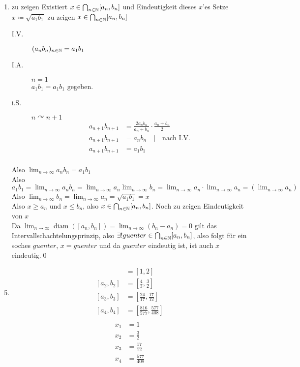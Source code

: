 \documentclass{gadsescript}
\DeclareMathOperator{\diam}{diam}
\begin{document}
\begin{proof*}
\begin{enumerate}[label=(\alph*)]
		\item zu zeigen Existiert $ x \in \bigcap_{n \in \mathbb{N}} [a_n, b_n] $ und Eindeutigkeit dieses $ x $'es
			Setze $ x \coloneqq \sqrt{a_1b_1}  $ zu zeigen $ x \in \bigcap_{n \in \mathbb{N}} [a_n, b_n] $
			\begin{description}
				\item[I.V.] $ (a_n b_n)_{n \in \mathbb{N} } = a_1b_1 $ 
				\item[I.A.] $ n = 1 $\\
					$ a_1 b_1 = a_1b_1 $ gegeben.
				\item[i.S.] $ n \curvearrowright n+1 $
					\begin{align*}
						a_{n+1}b_{n+1} &= \frac{ 2a_nb_n }{ a_n + b_n } \cdot \frac{ a_n + b_n }{ 2 } \\
						a_{n+1}b_{n+1} &= a_n b_n \quad | \quad \text{nach I.V.} \\
						a_{n+1}b_{n+1} &= a_1b_1 \\
					\end{align*}
			\end{description}
			Also $ \lim_{n \to \infty} a_nb_n = a_1b_1 $\\
			Also $ a_1b_1 = \lim_{n \to \infty} a_nb_n = \lim_{n \to \infty} a_n \lim_{n \to \infty} b_n = \lim_{n \to \infty} a_n \cdot \lim_{n \to \infty} a_n = \left( \lim_{n \to \infty} a_n \right) $\\
			Also $ \lim_{n \to \infty} b_n = \lim_{n \to \infty} a_n = \sqrt{a_1b_1} = x$\\
			Also $ x \geq a_n $ und $ x \leq b_n $, also $ x \in \bigcap_{n \in \mathbb{N} } [a_n, b_n] $. Noch zu zeigen Eindeutigkeit von $ x $\\
			Da $ \lim_{n \to \infty} \diam([a_n, b_n]) = \lim_{n \to \infty} (b_n - a_n) = 0 $ gilt das Intervallschachtelungsprinzip, also $ \exists ! guenter \in \bigcap_{n \in \mathbb{N} } [a_n, b_n] $, also folgt für ein soches $ guenter $, $ x = guenter $ und da $ guenter $ eindeutig ist, ist auch $ x $ eindeutig.\qed
	\end{enumerate}
\end{proof*}
\begin{enumerate}[label=(\alph*)]
	\setcounter{enumi}{4}
	\item 
		\begin{align*}
			[a_1,b_1]&=[1,2]\\
			[a_2,b_2]&=\left[\frac{ 4 }{ 3 },\frac{ 3 }{ 2 }  \right]\\
			[a_3,b_3]&=\left[\frac{ 24 }{ 17 },\frac{ 17 }{ 12 }  \right]\\
			[a_4,b_4]&=\left[\frac{ 816 }{ 577 },\frac{ 577 }{ 408 }  \right]\\
		\end{align*}
		\begin{align*}
			x_1&=1\\
			x_2&=\frac{ 3 }{ 2 }\\
			x_3&=\frac{ 17 }{ 12 }\\
			x_4&=\frac{ 577 }{ 408 } \\
		\end{align*}
\end{enumerate}
\end{document}
